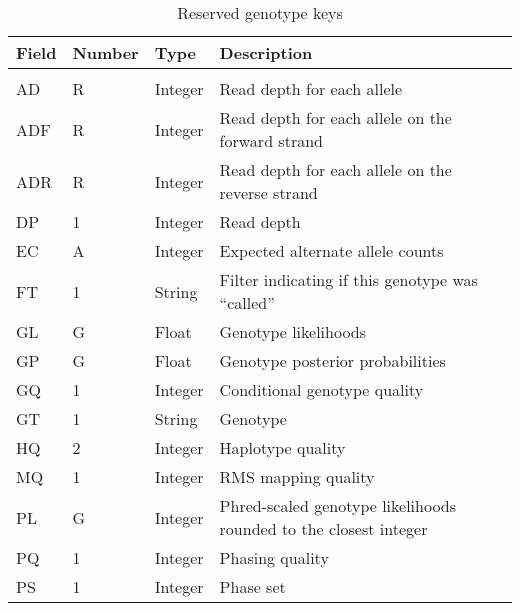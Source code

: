 \documentclass[8pt]{article}
\begin{document}
\begin{longtable}[c]{ | p{2.5cm} | p{1.5cm} | p{1.5cm} | p{10.3cm} | }
      \hline
      Field		& Number	& Type		& Description \\ \hline
  \endhead
      \hline
      \multicolumn{4}{l}{} \\
      \caption{\label{table:reserved-genotypes}Reserved genotype keys}
  \endfoot
      AD		& R		& Integer	& Read depth for each allele \\
      ADF		& R		& Integer	& Read depth for each allele on the forward strand \\
      ADR		& R		& Integer	& Read depth for each allele on the reverse strand \\
      DP		& 1		& Integer	& Read depth \\
      EC		& A		& Integer	& Expected alternate allele counts \\
      FT		& 1		& String	& Filter indicating if this genotype was ``called'' \\
      GL		& G		& Float		& Genotype likelihoods \\
      GP		& G		& Float		& Genotype posterior probabilities \\
      GQ		& 1		& Integer	& Conditional genotype quality \\
      GT		& 1		& String	& Genotype \\
      HQ		& 2		& Integer	& Haplotype quality \\
      MQ		& 1		& Integer	& RMS mapping quality \\
      PL		& G		& Integer	& Phred-scaled genotype likelihoods rounded to the closest integer \\
      PQ		& 1		& Integer	& Phasing quality \\
      PS		& 1		& Integer	& Phase set \\
\end{longtable}
\end{document}
